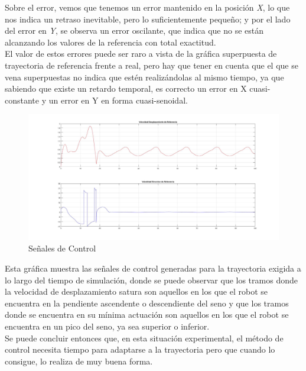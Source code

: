 \documentclass[a4paper,twoside]{article}
\begin{document}
\begin{itemize}
	Sobre el error, vemos que tenemos un error mantenido en la posición \textit{X}, lo que 
	nos indica un retraso inevitable, pero lo suficientemente pequeño; y por el lado del error 
	en \textit{Y}, se observa un error oscilante, que indica que no se están alcanzando los valores de la referencia
	con total exactitud.\\
	El valor de estos errores puede ser raro a vista de la gráfica superpuesta de trayectoria de referencia frente a real, pero hay que tener en cuenta que el que se vena superpuestas no indica que estén realizándolas al mismo tiempo, ya que sabiendo que existe un retardo temporal, es correcto un error en X cuasi-constante y un error en Y en forma cuasi-senoidal.
	\begin{figure}[h!]
		\centering
		\includegraphics[width=1\textwidth]{PurePursuitValoresEntrada}
		\caption{Señales de Control}
	\end{figure}
\newpage

	Esta gráfica muestra las señales de control generadas para la trayectoria exigida
	a lo largo del tiempo de simulación, donde se puede observar que los tramos donde la velocidad de desplazamiento satura son aquellos en los que el robot se encuentra en la pendiente ascendente o descendiente del seno y que los tramos donde se encuentra en su mínima actuación son aquellos en los que el robot se encuentra en un pico del seno, ya sea superior o inferior.\\
	
	Se puede concluir entonces que, en esta situación experimental, el método de control necesita tiempo para adaptarse a la trayectoria pero que cuando lo consigue, lo realiza de muy buena forma.

	\end{itemize}
\end{document}

